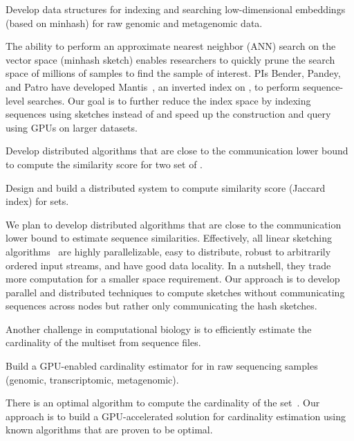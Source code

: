 \begin{rproblem}
Develop data structures for indexing and searching low-dimensional embeddings (based on minhash) for raw genomic and metagenomic data.
\end{rproblem}

The ability to perform an approximate nearest neighbor (ANN) search on the vector space (minhash sketch) enables researchers to quickly prune the search space of millions of samples to find the sample of interest. PIs  Bender, Pandey, and Patro have developed Mantis~\cite{mantis}, an inverted index on \kmers, to perform sequence-level searches. Our goal is to further reduce the index space by indexing sequences using sketches instead of \kmers and speed up the construction and query using GPUs on larger datasets.

\begin{rproblem}
Develop distributed algorithms that are close to the communication lower bound to  compute the similarity score for two set of \kmers.
\end{rproblem}

\begin{rproblem}
Design and build a distributed system to compute similarity score (Jaccard index) for \kmer sets.
\end{rproblem}

We plan to develop distributed algorithms that are close to the communication lower bound to estimate sequence similarities. Effectively, all linear sketching algorithms~\cite{li2014sketchuniversal} are highly parallelizable, easy to distribute, robust to arbitrarily ordered input streams, and have good data locality. In a nutshell, they trade more computation for a smaller space requirement. Our approach is to develop parallel and distributed techniques to compute sketches without communicating sequences across nodes but rather only communicating the hash sketches.

Another challenge in computational biology is to efficiently estimate the cardinality of the \kmer multiset from sequence files. 


\begin{rproblem}
Build a GPU-enabled cardinality estimator for \kmers in raw sequencing samples (genomic, transcriptomic, metagenomic).
\end{rproblem}

There is an optimal algorithm to compute the cardinality of the set~\cite{Kane2010}.
Our approach is to build a GPU-accelerated solution for cardinality estimation using known algorithms that are proven to be optimal.

